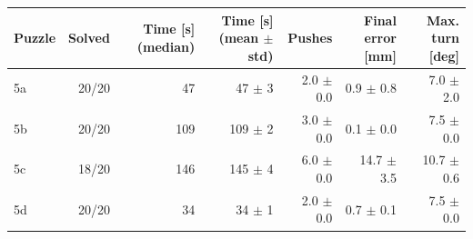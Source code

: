 \begin{tabular}{lrrrrrr}
\toprule
Puzzle & Solved & Time [s] (median) & Time [s] (mean $\pm$ std) & Pushes & Final error [mm] & Max. turn [deg] \\
\midrule
5a & 20/20 & 47 & 47 $\pm$ 3 & 2.0 $\pm$ 0.0 & 0.9 $\pm$ 0.8 & 7.0 $\pm$ 2.0 \\
5b & 20/20 & 109 & 109 $\pm$ 2 & 3.0 $\pm$ 0.0 & 0.1 $\pm$ 0.0 & 7.5 $\pm$ 0.0 \\
5c & 18/20 & 146 & 145 $\pm$ 4 & 6.0 $\pm$ 0.0 & 14.7 $\pm$ 3.5 & 10.7 $\pm$ 0.6 \\
5d & 20/20 & 34 & 34 $\pm$ 1 & 2.0 $\pm$ 0.0 & 0.7 $\pm$ 0.1 & 7.5 $\pm$ 0.0 \\
\bottomrule
\end{tabular}
